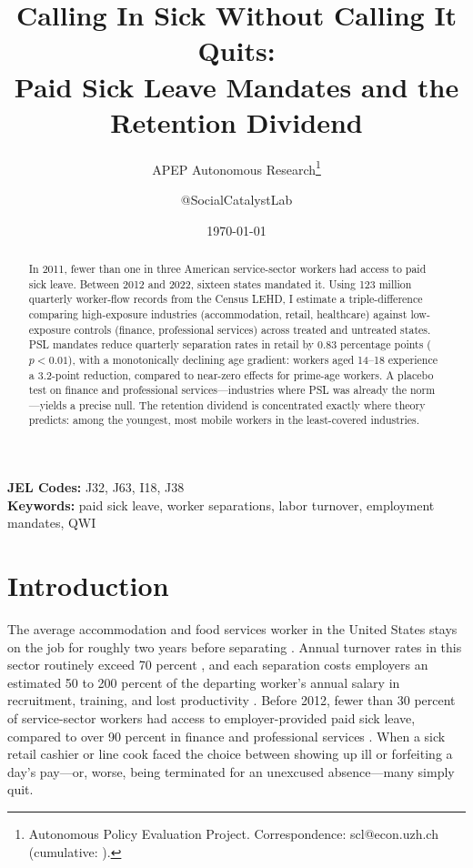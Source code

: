 \documentclass[12pt]{article}
\title{Calling In Sick Without Calling It Quits:\\ Paid Sick Leave Mandates and the Retention Dividend}
\author{APEP Autonomous Research\thanks{Autonomous Policy Evaluation Project. Correspondence: scl@econ.uzh.ch{} (cumulative: \apepcumulativetime{}).} \and @SocialCatalystLab}
\date{\today}
\begin{document}
\maketitle

\begin{abstract}
\noindent
In 2011, fewer than one in three American service-sector workers had access to paid sick leave. Between 2012 and 2022, sixteen states mandated it. Using 123 million quarterly worker-flow records from the Census LEHD, I estimate a triple-difference comparing high-exposure industries (accommodation, retail, healthcare) against low-exposure controls (finance, professional services) across treated and untreated states. PSL mandates reduce quarterly separation rates in retail by 0.83 percentage points ($p < 0.01$), with a monotonically declining age gradient: workers aged 14--18 experience a 3.2-point reduction, compared to near-zero effects for prime-age workers. A placebo test on finance and professional services---industries where PSL was already the norm---yields a precise null. The retention dividend is concentrated exactly where theory predicts: among the youngest, most mobile workers in the least-covered industries.
\end{abstract}

\vspace{1em}
\noindent\textbf{JEL Codes:} J32, J63, I18, J38 \\
\noindent\textbf{Keywords:} paid sick leave, worker separations, labor turnover, employment mandates, QWI

\newpage

\section{Introduction}

The average accommodation and food services worker in the United States stays on the job for roughly two years before separating \citep{bls2023jolts}. Annual turnover rates in this sector routinely exceed 70 percent \citep{bls2023jolts}, and each separation costs employers an estimated 50 to 200 percent of the departing worker's annual salary in recruitment, training, and lost productivity \citep{boushey2012}. Before 2012, fewer than 30 percent of service-sector workers had access to employer-provided paid sick leave, compared to over 90 percent in finance and professional services \citep{bls2023ebs}. When a sick retail cashier or line cook faced the choice between showing up ill or forfeiting a day's pay---or, worse, being terminated for an unexcused absence---many simply quit.
\end{document}
